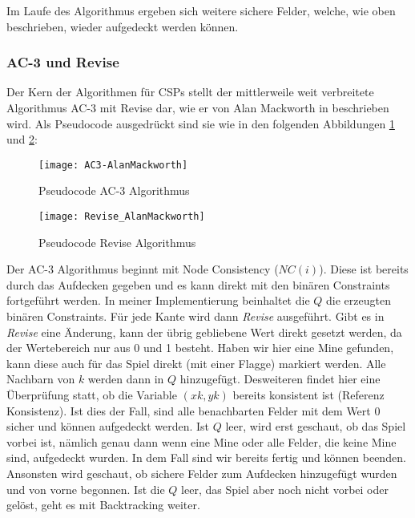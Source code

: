 Im Laufe des Algorithmus ergeben sich weitere sichere Felder, welche, wie oben beschrieben, wieder aufgedeckt werden können.

\subsubsection{AC-3 und Revise}

Der Kern der Algorithmen für CSPs stellt der mittlerweile weit verbreitete Algorithmus AC-3 mit Revise dar, wie er von Alan Mackworth in 
\cite{Alan} beschrieben wird. Als Pseudocode ausgedrückt sind sie wie in den folgenden Abbildungen \ref{AC3} und \ref{Revise}:

\begin{figure}[!htb]
    \centering
    \texttt{[image: AC3-AlanMackworth]}
    \caption{Pseudocode AC-3 Algorithmus}\label{AC3}
\end{figure}
\begin{figure}[!htb]
    \centering
    \texttt{[image: Revise\_AlanMackworth]}
    \caption{Pseudocode Revise Algorithmus}\label{Revise}
\end{figure}

Der AC-3 Algorithmus beginnt mit Node Consistency ($NC(i)$). Diese ist bereits durch das Aufdecken gegeben und es kann direkt mit den
binären Constraints fortgeführt werden. In meiner Implementierung beinhaltet die $Q$ die erzeugten binären Constraints. Für jede Kante wird
dann \textit{Revise} ausgeführt.\clearpage
Gibt es in \textit{Revise} eine Änderung, kann der übrig gebliebene Wert direkt gesetzt werden, da der 
Wertebereich nur aus 0 und 1 besteht. Haben wir hier eine Mine gefunden, kann diese auch für das Spiel direkt (mit einer Flagge) markiert
werden. Alle Nachbarn von $k$ werden dann in $Q$ hinzugefügt. Desweiteren findet hier eine Überprüfung statt, ob die Variable $(xk, yk)$ bereits
konsistent ist (Referenz Konsistenz). Ist dies der Fall, sind alle benachbarten Felder mit dem Wert 0 sicher und können aufgedeckt werden.
Ist $Q$ leer, wird erst geschaut, ob das Spiel vorbei ist, nämlich genau dann wenn eine Mine oder alle Felder, die keine Mine sind, aufgedeckt
wurden. In dem Fall sind wir bereits fertig und können beenden. Ansonsten wird geschaut, ob sichere Felder zum Aufdecken hinzugefügt wurden
und von vorne begonnen. Ist die $Q$ leer, das Spiel aber noch nicht vorbei oder gelöst, geht es mit Backtracking weiter.

